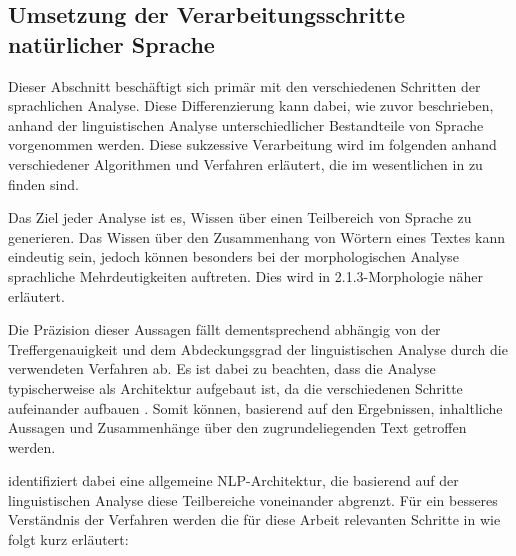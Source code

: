 \documentclass[12pt]{report}
\begin{document}
\subsection{Umsetzung der Verarbeitungsschritte natürlicher Sprache}
Dieser Abschnitt beschäftigt sich primär mit den verschiedenen Schritten der sprachlichen Analyse. Diese Differenzierung kann dabei, wie zuvor beschrieben, anhand der linguistischen Analyse unterschiedlicher Bestandteile von Sprache vorgenommen werden. Diese sukzessive Verarbeitung wird im folgenden anhand verschiedener Algorithmen und Verfahren erläutert, die im wesentlichen in \cite{rs18} zu finden sind. 

Das Ziel jeder Analyse ist es, Wissen über einen Teilbereich von Sprache zu generieren. Das Wissen über den Zusammenhang von Wörtern eines Textes kann eindeutig sein, jedoch können besonders bei der morphologischen Analyse sprachliche Mehrdeutigkeiten auftreten. Dies wird in 2.1.3-Morphologie näher erläutert. 

Die Präzision dieser Aussagen fällt dementsprechend abhängig von der Treffergenauigkeit und dem Abdeckungsgrad der linguistischen Analyse durch die verwendeten Verfahren ab. Es ist dabei zu beachten, dass die Analyse typischerweise als Architektur aufgebaut ist, da die verschiedenen Schritte aufeinander aufbauen \cite{cop04}. Somit können, basierend auf den Ergebnissen, inhaltliche Aussagen und Zusammenhänge über den zugrundeliegenden Text getroffen werden. 

\cite{cop04} identifiziert dabei eine allgemeine NLP-Architektur, die basierend auf der linguistischen Analyse diese Teilbereiche voneinander abgrenzt. 
Für ein besseres Verständnis der Verfahren werden die für diese Arbeit relevanten Schritte in \cite{rs18} wie folgt kurz erläutert:
\end{document}
